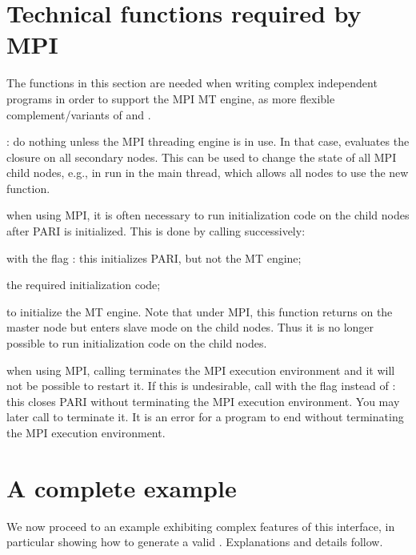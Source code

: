 {\section{Technical functions required by MPI}

The functions in this section are needed when writing complex independent
programs in order to support the MPI MT engine, as more flexible
complement/variants of  and .

: do nothing unless the MPI threading engine
is in use. In that case, evaluates the closure   on all secondary
nodes. This can be used to change the state of all MPI child nodes, e.g.,
in  run in the main thread, which allows all nodes to use the
new function.

when using MPI, it is often necessary to run initialization code on the child
nodes after PARI is initialized. This is done by calling successively:

\item {} with the flag :
this initializes PARI, but not the MT engine;

\item the required initialization code;

\item {} to initialize the MT engine.
Note that under MPI, this function returns on the master node but enters
slave mode on the child nodes. Thus it is no longer possible to run
initialization code on the child nodes.

when using MPI, calling  terminates the MPI execution
environment and it will not be possible to restart it. If this is
undesirable, call  with the flag 
instead of : this closes PARI without terminating the MPI
execution environment. You may later call  to terminate
it. It is an error for a program to end without terminating the MPI execution
environment.

\section{A complete example}

We now proceed to an example exhibiting complex features of this
interface, in particular showing how to generate a valid .
Explanations and details follow.

}
